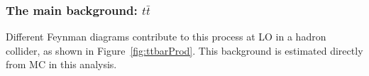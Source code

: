 \documentclass[a4paper, 10pt, openright]{report}
\begin{document}
\subsubsection{The main background: $t \bar t$} \label{subsection:ttbar}


Different Feynman diagrams contribute to this process at \ac{LO} in a hadron collider, as shown in Figure~\ref{fig:ttbarProd}. This background is estimated directly from \ac{MC} in this analysis.
\end{document}
